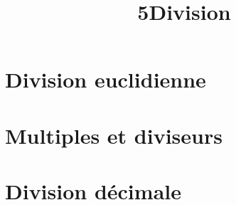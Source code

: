 \documentclass[12pt,a4paper]{article}
\date{}
\title{\textcircled{{\normalsize{5}}}Division}
\begin{document}
\maketitle








\section{Division euclidienne}






\section{Multiples et diviseurs}






\section{Division décimale}



\end{document}
